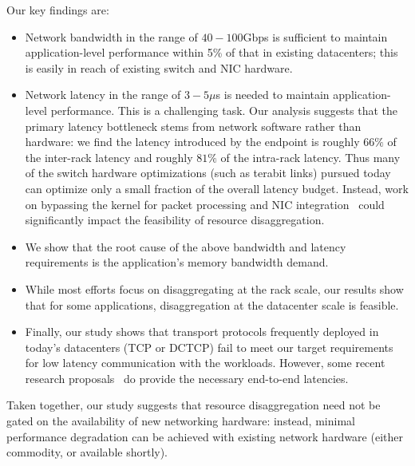 \noindent Our key findings are:

\begin{itemize}[leftmargin=*]

	\item Network bandwidth in the range of $40-100$Gbps is sufficient to maintain application-level performance within 5\% of that in existing datacenters; this is easily in reach of existing switch and NIC hardware. 
	\item Network latency in the range of $3-5\mu$s is needed to maintain application-level performance. This is a challenging task. Our analysis suggests that the primary latency bottleneck stems from  network software rather than hardware: we find the latency introduced by the endpoint is roughly $66\%$ of the inter-rack latency and roughly $81\%$ of the intra-rack latency. 
	Thus many of the switch hardware optimizations (such as terabit links) pursued today can optimize only a small fraction of the overall latency budget.
	Instead, work on bypassing the kernel for packet processing and NIC integration~\cite{cpu-nic} could significantly impact the feasibility of resource disaggregation.
	\item We show that the root cause of the above bandwidth and latency requirements is the application's memory bandwidth demand.
	\item While most efforts focus on disaggregating at the rack scale, our results show that for some applications, disaggregation at the datacenter scale is feasible.	
 	\item Finally, our study shows that transport protocols frequently deployed in today's datacenters (TCP or DCTCP) fail to meet our target requirements for low latency communication with the \dis workloads. However, some recent research proposals~\cite{pfabric, phost} do provide the necessary end-to-end latencies. 
\end{itemize} 

\noindent
Taken together, our study suggests that resource disaggregation need not be gated on the availability of new networking hardware: instead, minimal performance degradation can be achieved with existing network hardware (either commodity, or available shortly).

